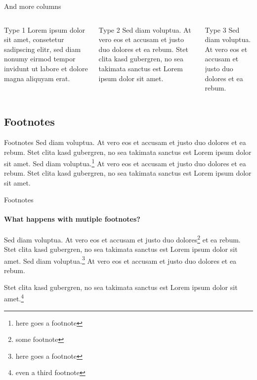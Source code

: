 \documentclass{beamer}
\begin{document}
\begin{frame}{And more columns}
\begin{columns}
\begin{column}{0.3\textwidth}
\begin{block}{Type 1}	
Lorem ipsum dolor sit amet, consetetur sadipscing elitr, sed diam nonumy eirmod tempor invidunt ut labore et dolore magna aliquyam erat.
\end{block}
\end{column}
\begin{column}{0.3\textwidth}
\begin{block}{Type 2}
Sed diam voluptua. At vero eos et accusam et justo duo dolores et ea rebum. Stet clita kasd gubergren, no sea takimata sanctus est Lorem ipsum dolor sit amet. 
\end{block}
\end{column}
\begin{column}{0.3\textwidth}
\begin{block}{Type 3}
Sed diam voluptua. At vero eos et accusam et justo duo dolores et ea rebum. 
\end{block}
\end{column}
\end{columns}
\end{frame}

\subsection{Footnotes}

\begin{frame}{Footnotes}
	Sed diam voluptua. At vero eos et accusam et justo duo dolores et ea rebum. Stet clita kasd gubergren, no sea takimata sanctus est Lorem ipsum dolor sit amet. Sed diam voluptua.\footnote{here goes a footnote} At vero eos et accusam et justo duo dolores et ea rebum. Stet clita kasd gubergren, no sea takimata sanctus est Lorem ipsum dolor sit amet.
\end{frame}

\begin{frame}{Footnotes}
\framesubtitle{What happens with mutiple footnotes?}
	Sed diam voluptua. At vero eos et accusam et justo duo dolores\footnote{some footnote} et ea rebum. Stet clita kasd gubergren, no sea takimata sanctus est Lorem ipsum dolor sit amet. Sed diam voluptua.\footnote{here goes a footnote} At vero eos et accusam et justo duo dolores et ea rebum. 
	
	Stet clita kasd gubergren, no sea takimata sanctus est Lorem ipsum dolor sit amet.\footnote{even a third footnote}
\end{frame}
\end{document}
